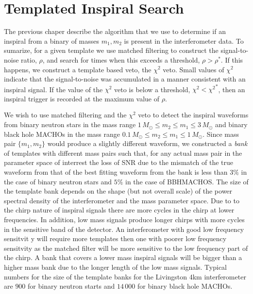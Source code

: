 
\section{Templated Inspiral Search}
\label{s:pipetemplate}

The previous chaper describe the algorithm that we use to determine if an
inspiral from a binary of masses ${m_1,m_2}$ is present in the interferometer
data. To sumarize, for a given template we use matched filtering to construct
the signal-to-noise ratio, $\rho$, and search for times when this exceeds a
threshold, $\rho > \rho^\ast$. If this happens, we construct a template based
veto, the $\chi^2$ veto\cite{brucechisq}. Small values of $\chi^2$ indicate
that the signal-to-noise was accumulated in a manner consistent with an
inspiral signal. If the value of the $\chi^2$ veto is below a threshold,
$\chi^2 < {\chi^2}^\ast$, then an inspiral trigger is recorded at the maximum
value of $\rho$.

We wish to use matched filtering and the $\chi^2$ veto to detect the inspiral
waveforms from binary neutron stars in the mass range $1\,M_\odot\le m_2\le
m_1\le 3\,M_\odot$ and binary black hole MACHOs in the mass range
$0.1\,M_\odot\le m_2\le m_1\le 1\,M_\odot$. Since mass pair $\{m_1,m_2\}$
would produce a slightly different waveform, we constructed a {\em bank} of
templates with different mass pairs such that, for any actual mass pair in the
parameter space of interrest the loss of SNR due to the mismatch of the true
waveform from that of the best fitting waveform from the bank is less than
$3\%$ in the case of binary neutron stars and $5\%$ in the case of
BBHMACHOS\cite{owensatyha}.  The size of the template bank depends on the 
shape (but not overall scale) of the power spectral density of the
interferometer and the mass parameter space. Due to to the chirp nature of
inspiral signals there are more cycles in the chirp at lower frequencies. In
addition, low mass signals produce longer chirps with more cycles in the
sensitive band of the detector. An interferometer with good low frequency
sensitvit y will require more templates then one with poorer low frequency
sensitvity as the matched filter will be more sensitive to the low frequency
part of the chirp. A bank that covers a lower mass inspiral signals will be
bigger than a higher mass bank due to the longer length of the low mass signals. 
Typical numbers for the size of the template banks for the Livingston 4km
interferometer are $900$ for binary neutron starts and $14\,000$ for binary
black hole MACHOs.

